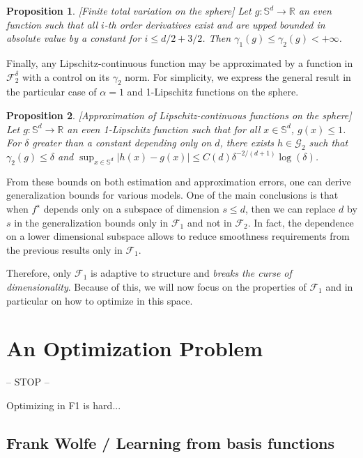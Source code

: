 \documentclass[a4paper, 11pt]{scrartcl}
\newtheorem{proposition}{Proposition}[section]
\begin{document}
\begin{proposition}
\emph{[Finite total variation on the sphere]} Let $g : \mathbb{S}^d \rightarrow \mathbb{R}$ an even function such that all $i$-th order derivatives exist and are upped bounded in absolute value by a constant for $i \leq d/2 + 3/2$. Then $\gamma_1(g) \leq \gamma_2(g) < +\infty$.
\end{proposition}

Finally, any Lipschitz-continuous function may be approximated by a function in $\mathcal{F}_2^\delta$ with a control on its $\gamma_2$ norm. For simplicity, we express the general result in the particular case of $\alpha = 1$ and 1-Lipschitz functions on the sphere.

\begin{proposition}
\emph{[Approximation of Lipschitz-continuous functions on the sphere]} Let $g : \mathbb{S}^d \rightarrow \mathbb{R}$ an even 1-Lipschitz function such that for all $x \in  \mathbb{S}^d$, $g(x) \leq 1$. For $\delta$ greater than a constant depending only on $d$, there exists $h\in \mathcal{G}_2$ such that $\gamma_2(g) \leq \delta$ and $\sup_{x \in  \mathbb{S}^d} |h(x) - g(x)| \leq C(d) \delta^{-2/(d+1)} \log(\delta)$.
\end{proposition}

From these bounds on both estimation and approximation errors, one can derive generalization bounds for various models. One of the main conclusions is that when $f^\star$ depends only on a subspace of dimension $s \leq d$, then we can replace $d$ by $s$ in the generalization bounds only in $\mathcal{F}_1$ and not in $\mathcal{F}_2$. In fact, the dependence on a lower dimensional subspace allows to reduce smoothness requirements from the previous results only in $\mathcal{F}_1$.

 Therefore, only $\mathcal{F}_1$ is adaptive to structure and \textit{breaks the curse of dimensionality}. Because of this, we will now focus on the properties of $\mathcal{F}_1$ and in particular on how to optimize in this space.

\section{An Optimization Problem}

-- STOP --

Optimizing in F1 is hard...

\subsection{Frank Wolfe /  Learning from basis functions}
\end{document}
